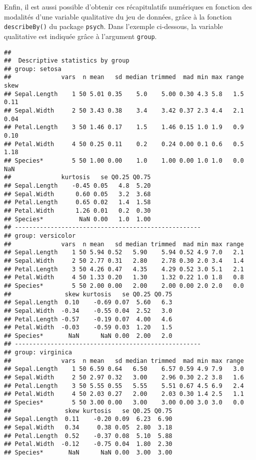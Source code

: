 \documentclass[
]{book}
\newenvironment{Shaded}{\begin{snugshade}}{\end{snugshade}}
\newcommand{\AttributeTok}[1]{\textcolor[rgb]{0.77,0.63,0.00}{#1}}
\newcommand{\FloatTok}[1]{\textcolor[rgb]{0.00,0.00,0.81}{#1}}
\newcommand{\FunctionTok}[1]{\textcolor[rgb]{0.00,0.00,0.00}{#1}}
\newcommand{\NormalTok}[1]{#1}
\newcommand{\SpecialCharTok}[1]{\textcolor[rgb]{0.00,0.00,0.00}{#1}}
\begin{document}
Enfin, il est aussi possible d'obtenir ces récapitulatifs numériques en fonction des modalités d'une variable qualitative du jeu de données, grâce à la fonction \texttt{describeBy()} du package \texttt{psych}. Dans l'exemple ci-dessous, la variable qualitative est indiquée grâce à l'argument \texttt{group}.

\begin{Shaded}
\end{Shaded}

\begin{verbatim}
## 
##  Descriptive statistics by group 
## group: setosa
##              vars  n mean   sd median trimmed  mad min max range skew
## Sepal.Length    1 50 5.01 0.35    5.0    5.00 0.30 4.3 5.8   1.5 0.11
## Sepal.Width     2 50 3.43 0.38    3.4    3.42 0.37 2.3 4.4   2.1 0.04
## Petal.Length    3 50 1.46 0.17    1.5    1.46 0.15 1.0 1.9   0.9 0.10
## Petal.Width     4 50 0.25 0.11    0.2    0.24 0.00 0.1 0.6   0.5 1.18
## Species*        5 50 1.00 0.00    1.0    1.00 0.00 1.0 1.0   0.0  NaN
##              kurtosis   se Q0.25 Q0.75
## Sepal.Length    -0.45 0.05   4.8  5.20
## Sepal.Width      0.60 0.05   3.2  3.68
## Petal.Length     0.65 0.02   1.4  1.58
## Petal.Width      1.26 0.01   0.2  0.30
## Species*          NaN 0.00   1.0  1.00
## ---------------------------------------------------- 
## group: versicolor
##              vars  n mean   sd median trimmed  mad min max range
## Sepal.Length    1 50 5.94 0.52   5.90    5.94 0.52 4.9 7.0   2.1
## Sepal.Width     2 50 2.77 0.31   2.80    2.78 0.30 2.0 3.4   1.4
## Petal.Length    3 50 4.26 0.47   4.35    4.29 0.52 3.0 5.1   2.1
## Petal.Width     4 50 1.33 0.20   1.30    1.32 0.22 1.0 1.8   0.8
## Species*        5 50 2.00 0.00   2.00    2.00 0.00 2.0 2.0   0.0
##               skew kurtosis   se Q0.25 Q0.75
## Sepal.Length  0.10    -0.69 0.07  5.60   6.3
## Sepal.Width  -0.34    -0.55 0.04  2.52   3.0
## Petal.Length -0.57    -0.19 0.07  4.00   4.6
## Petal.Width  -0.03    -0.59 0.03  1.20   1.5
## Species*       NaN      NaN 0.00  2.00   2.0
## ---------------------------------------------------- 
## group: virginica
##              vars  n mean   sd median trimmed  mad min max range
## Sepal.Length    1 50 6.59 0.64   6.50    6.57 0.59 4.9 7.9   3.0
## Sepal.Width     2 50 2.97 0.32   3.00    2.96 0.30 2.2 3.8   1.6
## Petal.Length    3 50 5.55 0.55   5.55    5.51 0.67 4.5 6.9   2.4
## Petal.Width     4 50 2.03 0.27   2.00    2.03 0.30 1.4 2.5   1.1
## Species*        5 50 3.00 0.00   3.00    3.00 0.00 3.0 3.0   0.0
##               skew kurtosis   se Q0.25 Q0.75
## Sepal.Length  0.11    -0.20 0.09  6.23  6.90
## Sepal.Width   0.34     0.38 0.05  2.80  3.18
## Petal.Length  0.52    -0.37 0.08  5.10  5.88
## Petal.Width  -0.12    -0.75 0.04  1.80  2.30
## Species*       NaN      NaN 0.00  3.00  3.00
\end{verbatim}
\end{document}

